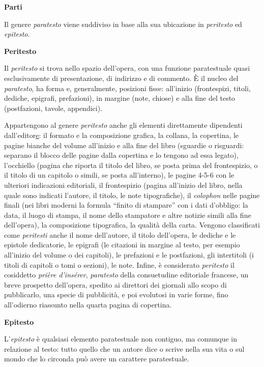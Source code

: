 \documentclass[
  b5paper,
  twoside,
  12pt,
  chapterprefix=false,
  bibliography=totocnumbered,
  parskip=false]{scrbook}
\begin{document}
\phantom{~}

\textbf{Parti}

Il genere \emph{paratesto} viene suddiviso in base alla sua ubicazione in
\emph{peritesto} ed \emph{epitesto}.

\phantom{~}

\textbf{Peritesto}

Il \emph{peritesto} si trova nello spazio dell'opera, con una funzione
paratestuale quasi esclusivamente di presentazione, di indirizzo e di
commento. È il nucleo del \emph{paratesto}, ha forma e, generalmente,
posizioni fisse: all'inizio (frontespizi, titoli, dediche, epigrafi,
prefazioni), in margine (note, chiose) e alla fine del testo
(postfazioni, tavole, appendici).

Appartengono al genere \emph{peritesto} anche gli elementi direttamente
dipendenti dall'editor\href{https://it.wikipedia.org/wiki/Editore}{e}: il
formato e la composizione grafica, la collana, la copertina, le pagine
bianche del volume all'inizio e alla fine del libro (sguardie o
risguardi: separano il blocco delle pagine dalla copertina e lo tengono
ad essa legato), l'occhiello (pagina che riporta il titolo del libro, se
posta prima del frontespizio, o il titolo di un capitolo o simili, se
posta all'interno), le pagine 4-5-6 con le ulteriori indicazioni
editoriali, il frontespizio (pagina all'inizio del libro, nella quale
sono indicati l'autore, il titolo, le note tipografiche), il \emph{colophon}
nelle pagine finali (nei libri moderni la formula \enquote{finito di stampare}
con i dati d'obbligo: la data, il luogo di stampa, il nome dello
stampatore e altre notizie simili alla fine dell'opera), la composizione
tipografica, la qualità della carta. Vengono classificati come
\emph{peritesti} anche il nome dell'autore, il titolo dell'opera, le dediche
e le epistole dedicatorie, le epigrafi (le citazioni in margine al
testo, per esempio all'inizio del volume o dei capitoli), le prefazioni
e le postfazioni, gli intertitoli (i titoli di capitoli o tomi o
sezioni), le note. Infine, è considerato \emph{peritesto} il cosiddetto
\emph{prière d'insérer}, \emph{paratesto} della consuetudine editoriale francese,
un breve prospetto dell'opera, spedito ai direttori dei giornali allo
scopo di pubblicarlo, una specie di pubblicità, e poi evolutosi in varie
forme, fino all'odierno riassunto nella quarta pagina di copertina.

\phantom{~}

\textbf{Epitesto}

L'\emph{epitesto} è qualsiasi elemento paratestuale non contiguo, ma
comunque in relazione al testo: tutto quello che un autore dice o scrive
nella sua vita o sul mondo che lo circonda può avere un carattere
paratestuale.
\end{document}
